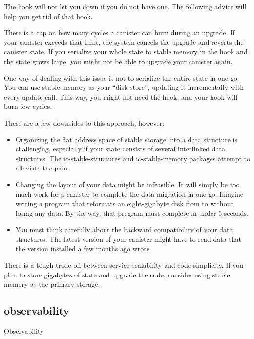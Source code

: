 \documentclass{article}
\begin{document}
The  hook will not let you down if you do not have one.
The following advice will help you get rid of that hook.


There is a cap on how many cycles a canister can burn during an upgrade.
If your canister exceeds that limit, the system cancels the upgrade and reverts the canister state.
If you serialize your whole state to stable memory in the  hook and the state grows large, you might not be able to upgrade your canister again.

One way of dealing with this issue is not to serialize the entire state in one go.
You can use stable memory as your ``disk store'', updating it incrementally with every update call.
This way, you might not need the  hook, and your  hook will burn few cycles.

There are a few downsides to this approach, however:
\begin{itemize}
\item 
  Organizing the flat address space of stable storage into a data structure is challenging, especially if your state consists of several interlinked data structures.
  The \href{https://github.com/dfinity/stable-structures}{ic-stable-structures} and \href{https://github.com/seniorjoinu/ic-stable-memory}{ic-stable-memory} packages attempt to alleviate the pain.
\item 
  Changing the layout of your data might be infeasible.
  It will simply be too much work for a canister to complete the data migration in one go.
  Imagine writing a program that reformats an eight-gigabyte disk from  to  without losing any data.
  By the way, that program must complete in under 5 seconds.
\item 
  You must think carefully about the backward compatibility of your data structures.
  The latest version of your canister might have to read data that the version installed a few months ago wrote.
\end{itemize}

There is a tough trade-off between service scalability and code simplicity.
If you plan to store gigabytes of state and upgrade the code, consider using stable memory as the primary storage.

\subsection{observability}{Observability}
\end{document}
